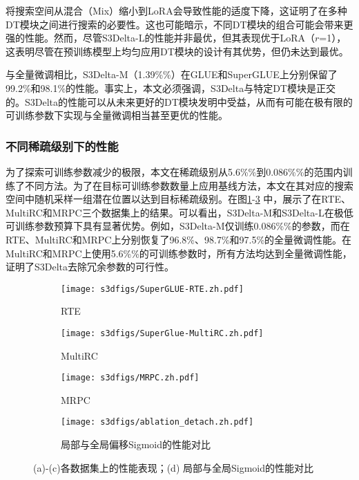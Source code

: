 将搜索空间从混合（Mix）缩小到LoRA会导致性能的适度下降，这证明了在多种DT模块之间进行搜索的必要性。这也可能暗示，不同DT模块的组合可能会带来更强的性能。然而，尽管S3Delta-L的性能并非最优，但其表现优于LoRA（$r$=1），这表明尽管在预训练模型上均匀应用DT模块的设计有其优势，但仍未达到最优。

与全量微调相比，S3Delta-M（1.39\%\%）在GLUE和SuperGLUE上分别保留了99.2\%和98.1\%的性能。事实上，本文必须强调，S3Delta与特定DT模块是正交的。S3Delta的性能可以从未来更好的DT模块发明中受益，从而有可能在极有限的可训练参数下实现与全量微调相当甚至更优的性能。

\subsubsection{不同稀疏级别下的性能}
\label{sec:exp:sparsitylevel}
为了探索可训练参数减少的极限，本文在稀疏级别从5.6\%\%到0.086\%\%的范围内训练了不同方法。为了在目标可训练参数数量上应用基线方法，本文在其对应的搜索空间中随机采样一组潜在位置以达到目标稀疏级别。在图\ref{fig:case3}-\ref{fig:case5} 中，展示了在RTE、MultiRC和MRPC三个数据集上的结果。可以看出，S3Delta-M和S3Delta-L在极低可训练参数预算下具有显著优势。例如，S3Delta-M仅训练0.086\%\%的参数，而在RTE、MultiRC和MRPC上分别恢复了96.8\%、98.7\%和97.5\%的全量微调性能。在MultiRC和MRPC上使用5.6\%\%的可训练参数时，所有方法均达到全量微调性能，证明了S3Delta去除冗余参数的可行性。

\begin{figure}[htbp]
    \centering
    \begin{subfigure}[t]{0.48\textwidth}
      \centering
      \texttt{[image: s3dfigs/SuperGLUE-RTE.zh.pdf]}
      \caption{RTE}
      \label{fig:case3}
    \end{subfigure}%
    \hfill
    \begin{subfigure}[t]{0.48\textwidth}
      \centering
      \texttt{[image: s3dfigs/SuperGlue-MultiRC.zh.pdf]}
      \caption{MultiRC}
      \label{fig:case4}
    \end{subfigure}
    
    \vspace{0.5em} %
    
    \begin{subfigure}[t]{0.48\textwidth}
      \centering
      \texttt{[image: s3dfigs/MRPC.zh.pdf]}
      \caption{MRPC}
      \label{fig:case5}
    \end{subfigure}%
    \hfill
    \begin{subfigure}[t]{0.48\textwidth}
      \centering
      \texttt{[image: s3dfigs/ablation\_detach.zh.pdf]}
      \caption{局部与全局偏移Sigmoid的性能对比}
      \label{app:fig:detach}
    \end{subfigure}
    
    \caption{(a)-(c)各数据集上的性能表现；(d) 局部与全局Sigmoid的性能对比}
    \label{fig:combined}
  \end{figure}
  

